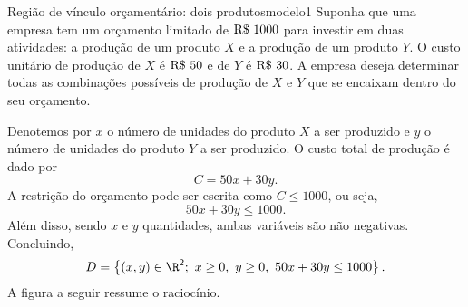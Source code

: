 \begin{example}{Região de vínculo orçamentário: dois produtos}{modelo1}
Suponha que uma empresa tem um orçamento limitado de $\textup{R}\$~1000$ para investir em duas atividades: a produção de um produto $X$ e a produção de um produto $Y$. O custo unitário de produção de 
$X$ é $\textup{R}\$~50$ e de $Y$ é $\textup{R}\$~30$. A empresa deseja determinar todas as combinações possíveis de produção de $X$ e $Y$ que se encaixam dentro do seu orçamento. 

\solution

Denotemos por $x$ o número de unidades do produto $X$ a ser produzido e $y$ o número de unidades do produto $Y$ a ser produzido. O custo total de produção é dado por 
$$C=50x+30y.$$
A restrição do orçamento pode ser escrita como $C\leq 1000$, ou seja,
$$50x+30y\leq 1000.$$
Além disso, sendo $x$ e $y$ quantidades, ambas variáveis são não negativas. Concluindo, 
$$D=\left\{(x,y)\in \R^2;~x\geq 0,~y\geq0,~50x+30y\leq 1000 \right\}.$$
A figura a seguir ressume o raciocínio. 
\begin{comment}
Precisamos, portanto, entender os conjuntos
$$\begin{cases}
\left\{(x,y)\in\R^2;~x\geq 0\right\},\\
\left\{(x,y)\in\R^2;~y\geq 0\right\},\\
\left\{(x,y)\in\R^2;~50x+30y\leq 1000\right\}.
\end{cases}
$$
\end{comment}

\begin{center}
{}
\end{center}
\end{example}
